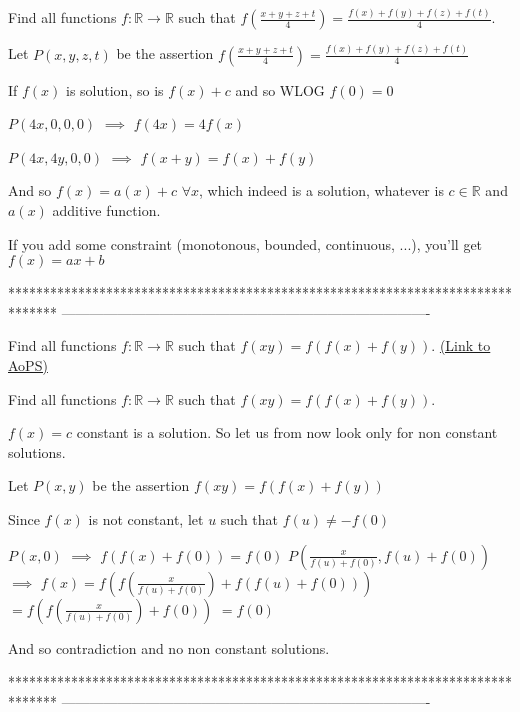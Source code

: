 \begin{solution}
	\begin{tcolorbox}Find all functions $f: \mathbb{R}\to\mathbb{R}$ such that $f(\frac{x+y+z+t}{4})=\frac{f(x)+f(y)+f(z)+f(t)}{4}$.\end{tcolorbox}
Let $P(x,y,z,t)$ be the assertion $f(\frac{x+y+z+t}4)=\frac{f(x)+f(y)+f(z)+f(t)}4$

If $f(x)$ is solution, so is $f(x)+c$ and so WLOG $f(0)=0$

$P(4x,0,0,0)$ $\implies$ $f(4x)=4f(x)$

$P(4x,4y,0,0)$ $\implies$ $f(x+y)=f(x)+f(y)$

And so $\boxed{f(x)=a(x)+c}$ $\forall x$, which indeed is a solution, whatever is $c\in\mathbb R$ and $a(x)$ additive function.


If you add some constraint (monotonous, bounded, continuous, ...), you'll get $f(x)=ax+b$
\end{solution}
*******************************************************************************
-------------------------------------------------------------------------------

\begin{problem}
	Find all functions $f: \mathbb{R}\to\mathbb{R}$ such that $f(xy)=f(f(x)+f(y))$.
	\flushright \href{https://artofproblemsolving.com/community/c6h567272}{(Link to AoPS)}
\end{problem}



\begin{solution}
	\begin{tcolorbox}Find all functions $f: \mathbb{R}\to\mathbb{R}$ such that $f(xy)=f(f(x)+f(y))$.\end{tcolorbox}
$\boxed{f(x)=c}$ constant is a solution. So let us from now look only for non constant solutions.

Let $P(x,y)$ be the assertion $f(xy)=f(f(x)+f(y))$

Since $f(x)$ is not constant, let $u$ such that $f(u)\ne -f(0)$

$P(x,0)$ $\implies$ $f(f(x)+f(0))=f(0)$
$P(\frac x{f(u)+f(0)},f(u)+f(0))$ $\implies$ $f(x)=f(f(\frac x{f(u)+f(0)})+f(f(u)+f(0)))$ $=f(f(\frac x{f(u)+f(0)})+f(0))$ $=f(0)$

And so contradiction and no non constant solutions.
\end{solution}
*******************************************************************************
-------------------------------------------------------------------------------

